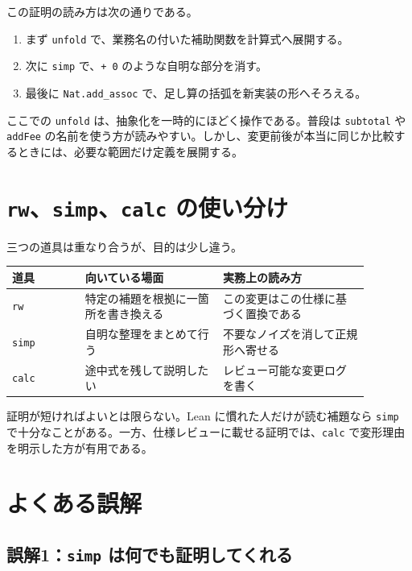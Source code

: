 この証明の読み方は次の通りである。

\begin{enumerate}
\item まず \texttt{unfold} で、業務名の付いた補助関数を計算式へ展開する。
\item 次に \texttt{simp} で、\texttt{+ 0} のような自明な部分を消す。
\item 最後に \texttt{Nat.add\_assoc} で、足し算の括弧を新実装の形へそろえる。
\end{enumerate}

ここでの \texttt{unfold} は、抽象化を一時的にほどく操作である。普段は \texttt{subtotal} や \texttt{addFee} の名前を使う方が読みやすい。しかし、変更前後が本当に同じか比較するときには、必要な範囲だけ定義を展開する。

\section{\texorpdfstring{\texttt{rw}、\texttt{simp}、\texttt{calc} の使い分け}{rw、simp、calc の使い分け}}

三つの道具は重なり合うが、目的は少し違う。

\begin{center}
\begin{tabular}{p{0.18\linewidth}p{0.34\linewidth}p{0.36\linewidth}}
\toprule
道具 & 向いている場面 & 実務上の読み方 \\
\midrule
\texttt{rw} & 特定の補題を根拠に一箇所を書き換える & この変更はこの仕様に基づく置換である \\
\texttt{simp} & 自明な整理をまとめて行う & 不要なノイズを消して正規形へ寄せる \\
\texttt{calc} & 途中式を残して説明したい & レビュー可能な変更ログを書く \\
\bottomrule
\end{tabular}
\end{center}

\begin{leanbox}
証明が短ければよいとは限らない。Lean に慣れた人だけが読む補題なら \texttt{simp} で十分なことがある。一方、仕様レビューに載せる証明では、\texttt{calc} で変形理由を明示した方が有用である。
\end{leanbox}

\section{よくある誤解}

\subsection{誤解1：\texttt{simp} は何でも証明してくれる}

